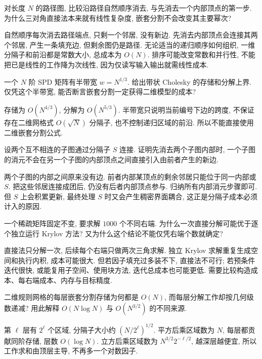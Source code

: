 \begin{exercise}
对长度 $N$ 的路径图, 比较沿路径自然顺序消去, 与先消去一个内部顶点的第一步. 为什么三对角直接法本来就有线性复杂度, 嵌套分割不会改变其主要幂次?
\end{exercise}
\begin{solution}
自然顺序每次消去路径端点, 只剩一个邻居, 没有新边. 先消去内部顶点会连接其两个邻居, 产生一条填充边, 但剩余图仍是路径. 无论适当的递归顺序如何组织, 一维分隔子和前沿都是常数大小, 总成本为 $O(N)$. 排序可能改变常数和并行性, 不能把已是线性的工作降为次线性, 因为仅读写输入输出就需线性成本.
\end{solution}
\begin{exercise}
一个 $N$ 阶 SPD 矩阵有半带宽 $w=N^{1/3}$. 给出带状 Cholesky 的存储和分解上界. 仅凭这个半带宽, 能否断言嵌套分割一定获得二维模型的成本?
\end{exercise}
\begin{solution}
存储为 $O(N^{4/3})$, 分解为 $O(N^{5/3})$. 半带宽只说明当前编号下边的跨度, 不保证存在二维网格式 $O(\sqrt N)$ 分隔子, 也不控制递归区域的前沿. 所以不能直接使用二维嵌套分割公式.
\end{solution}
\begin{exercise}
设两个互不相连的子图通过分隔子 $S$ 连接. 证明先消去两个子图内部时, 一个子图的消元不会在另一个子图的内部顶点之间直接引入由前者产生的新边.
\end{exercise}
\begin{solution}
两个子图的内部之间原来没有边. 前者内部某顶点的剩余邻居只能位于同一内部或 $S$. 把这些邻居连接成团后, 仍没有后者内部顶点参与. 归纳所有内部消元步骤即可. 但 $S$ 上会积累更新, 最终处理 $S$ 时又会产生稠密界面耦合, 这正是分隔子成本必须计入的原因.
\end{solution}
\begin{exercise}
一个稀疏矩阵固定不变, 要求解 $1000$ 个不同右端. 为什么一次直接分解可能优于逐个独立运行 Krylov 方法? 又为什么这个结论不能仅凭右端个数就确定?
\end{exercise}
\begin{solution}
直接法只分解一次, 后续每个右端只做两次三角求解. 独立 Krylov 求解重复生成空间和执行内积, 成本可能很大. 但若因子填充过多装不下, 直接法不可行; 若预条件迭代很快, 或能复用子空间、使用块方法, 迭代总成本也可能更低. 需要比较构造成本、每右端成本、内存与目标精度.
\end{solution}
\begin{exercise}
二维规则网格的每层嵌套分割存储为何都是 $O(N)$, 而每层分解工作却按几何级数递减? 用此解释 $O(N\log N)$ 与 $O(N^{3/2})$ 的不同来源.
\end{exercise}
\begin{solution}
第 $\ell$ 层有 $2^\ell$ 个区域, 分隔子大小约 $(N/2^\ell)^{1/2}$. 平方后乘区域数为 $N$, 每层都贡献同阶存储, 层数 $O(\log N)$. 立方后乘区域数为 $N^{3/2}2^{-\ell/2}$, 越深层越便宜, 所以工作求和由顶层主导, 不再多一个对数因子.
\end{solution}
